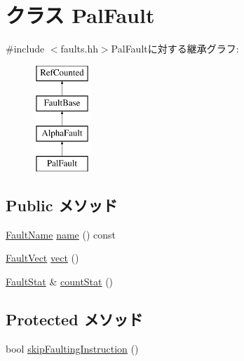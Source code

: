 \hypertarget{classAlphaISA_1_1PalFault}{
\section{クラス PalFault}
\label{classAlphaISA_1_1PalFault}
}


{\ttfamily \#include $<$faults.hh$>$}PalFaultに対する継承グラフ:\begin{figure}[H]
\begin{center}
\leavevmode
\includegraphics[height=4cm]{classAlphaISA_1_1PalFault}
\end{center}
\end{figure}
\subsection*{Public メソッド}
\begin{DoxyCompactItemize}
\item 
\hyperlink{sim_2faults_8hh_abb196df64725e5c2568c900cf130d8d7}{FaultName} \hyperlink{classAlphaISA_1_1PalFault_a73adb23259baf912a81683a9790a303f}{name} () const 
\item 
\hyperlink{classm5_1_1params_1_1Addr}{FaultVect} \hyperlink{classAlphaISA_1_1PalFault_ae15c5d7ab0162821b93d668d0b225198}{vect} ()
\item 
\hyperlink{classStats_1_1Scalar}{FaultStat} \& \hyperlink{classAlphaISA_1_1PalFault_a6c79663c761ff57265459f7e3aefaf4c}{countStat} ()
\end{DoxyCompactItemize}
\subsection*{Protected メソッド}
\begin{DoxyCompactItemize}
\item 
bool \hyperlink{classAlphaISA_1_1PalFault_a4dca22d2e3f19609672fe85bb5e28b56}{skipFaultingInstruction} ()
\end{DoxyCompactItemize}
